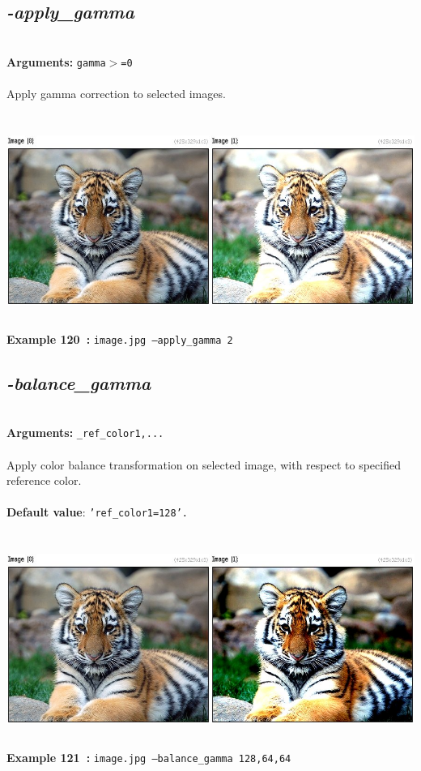 \documentclass[a4paper,11pt,twoside]{book}
\begin{document}
\subsection{\emph{-apply\_gamma} }\vspace*{-0.5em}
~\\\textbf{Arguments: } 
{\small \texttt{gamma$>$=0}}\\~\\
Apply gamma correction to selected images.
\begin{center}\includegraphics[keepaspectratio=true,height=7cm,width=\textwidth]{img/gmic_def120.jpg}\\
{\footnotesize \textbf{Example 120~:} \texttt{image.jpg --apply\_gamma 2}}
\end{center}

\subsection{\emph{-balance\_gamma} }\vspace*{-0.5em}
~\\\textbf{Arguments: } 
{\small \texttt{\_ref\_color1,...}}\\~\\
Apply color balance transformation on selected image, with respect to specified reference color.
~\\~\\\textbf{Default value}: {\small \texttt{'ref\_color1=128'.}}
\begin{center}\includegraphics[keepaspectratio=true,height=7cm,width=\textwidth]{img/gmic_def121.jpg}\\
{\footnotesize \textbf{Example 121~:} \texttt{image.jpg --balance\_gamma 128,64,64}}
\end{center}
\end{document}
